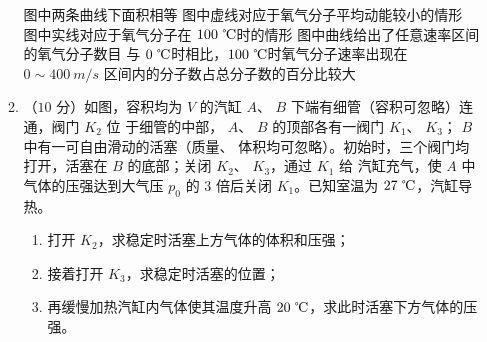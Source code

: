 \begin{enumerate}
\begin{enumerate}
\fivechoices
{图中两条曲线下面积相等}
{图中虚线对应于氧气分子平均动能较小的情形}
{图中实线对应于氧气分子在 $ 100 \ \celsius $时的情形}
{图中曲线给出了任意速率区间的氧气分子数目}
{与 $ 0 \ \celsius $时相比，$ 100 \ \celsius $时氧气分子速率出现在 $ 0 \sim 400 \ m/s $ 区间内的分子数占总分子数的百分比较大}


\item 
（$ 10 $ 分）如图，容积均为 $ V $ 的汽缸 $ A $、 $ B $ 下端有细管（容积可忽略）连通，阀门 $ K_{2} $ 位
于细管的中部， $ A $、 $ B $ 的顶部各有一阀门 $ K_{1} $、 $ K_{3} $； $ B $ 中有一可自由滑动的活塞（质量、
体积均可忽略）。初始时，三个阀门均打开，活塞在 $ B $ 的底部；关闭 $ K_{2} $、 $ K_{3} $，通过 $ K_{1} $ 给
汽缸充气，使 $ A $ 中气体的压强达到大气压 $ p_{0} $ 的 $ 3 $ 倍后关闭 $ K_{1} $。已知室温为 $ 27 \ \celsius $，汽缸导
热。
\begin{enumerate}
\renewcommand{\labelenumi}{\arabic{enumi}.}
\item
打开 $ K_{2} $，求稳定时活塞上方气体的体积和压强；
\item 
接着打开 $ K_{3} $，求稳定时活塞的位置；
\item 
再缓慢加热汽缸内气体使其温度升高 $ 20 \ \celsius $，求此时活塞下方气体的压强。




\end{enumerate}
\begin{figure}[h!]
\flushright

\end{figure}




\end{enumerate}






\end{enumerate}
